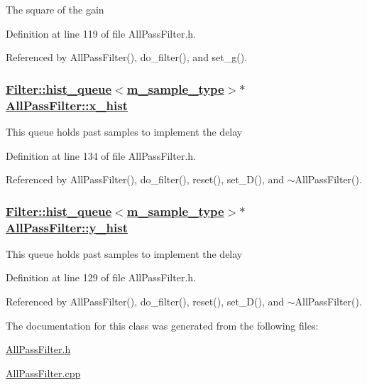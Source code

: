 The square of the gain 

Definition at line 119 of file All\-Pass\-Filter.h.

Referenced by All\-Pass\-Filter(), do\_\-filter(), and set\_\-g().\hypertarget{classAllPassFilter_r4}{
\subsubsection[x\_\-hist]{\setlength{\rightskip}{0pt plus 5cm}\hyperlink{classFilter_1_1hist__queue}{Filter::hist\_\-queue}$<$\hyperlink{Types_8h_a0}{m\_\-sample\_\-type}$>$$\ast$ \hyperlink{classAllPassFilter_r4}{All\-Pass\-Filter::x\_\-hist}}}
\label{classAllPassFilter_r4}


This queue holds past samples to implement the delay 

Definition at line 134 of file All\-Pass\-Filter.h.

Referenced by All\-Pass\-Filter(), do\_\-filter(), reset(), set\_\-D(), and $\sim$All\-Pass\-Filter().\hypertarget{classAllPassFilter_r3}{
\subsubsection[y\_\-hist]{\setlength{\rightskip}{0pt plus 5cm}\hyperlink{classFilter_1_1hist__queue}{Filter::hist\_\-queue}$<$\hyperlink{Types_8h_a0}{m\_\-sample\_\-type}$>$$\ast$ \hyperlink{classAllPassFilter_r3}{All\-Pass\-Filter::y\_\-hist}}}
\label{classAllPassFilter_r3}


This queue holds past samples to implement the delay 

Definition at line 129 of file All\-Pass\-Filter.h.

Referenced by All\-Pass\-Filter(), do\_\-filter(), reset(), set\_\-D(), and $\sim$All\-Pass\-Filter().

The documentation for this class was generated from the following files:\begin{CompactItemize}
\item 
\hyperlink{AllPassFilter_8h}{All\-Pass\-Filter.h}\item 
\hyperlink{AllPassFilter_8cpp}{All\-Pass\-Filter.cpp}\end{CompactItemize}
